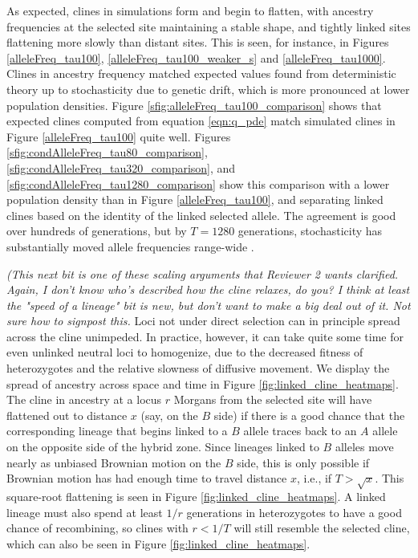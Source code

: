 \documentclass[11pt,letterpaper]{article}
\newcommand{\plr}[1]{{\em \color{blue} #1}}
\begin{document}
As expected, clines in simulations form and begin to flatten, 
with ancestry frequencies at the selected site maintaining a stable shape,
and tightly linked sites flattening more slowly than distant sites.
This is seen, for instance, in Figures \ref{alleleFreq_tau100},
\ref{alleleFreq_tau100_weaker_s} and \ref{alleleFreq_tau1000}. 
Clines in ancestry frequency matched expected values found from deterministic theory
up to stochasticity due to genetic drift, which is more pronounced at lower population densities.
Figure \ref{sfig:alleleFreq_tau100_comparison} shows that expected clines computed from equation \eqref{eqn:q_pde}
match simulated clines in Figure \ref{alleleFreq_tau100} quite well.
Figures \ref{sfig:condAlleleFreq_tau80_comparison}, \ref{sfig:condAlleleFreq_tau320_comparison}, and \ref{sfig:condAlleleFreq_tau1280_comparison}
show this comparison with a lower population density than in Figure \ref{alleleFreq_tau100},
and separating linked clines based on the identity of the linked selected allele.
The agreement is good over hundreds of generations, but by $T=1280$ generations,
stochasticity has substantially moved allele frequencies range-wide
\citep[which is unsurprising, as the total population size is only 5,000 diploids:][]{Polechova2011}.

\plr{(This next bit is one of these scaling arguments that Reviewer 2 wants clarified.  Again, I don't know who's described how the cline relaxes, do you?  I think at least the "speed of a lineage" bit is new, but don't want to make a big deal out of it.  Not sure how to signpost this.}
Loci not under direct selection can in principle spread across the cline unimpeded. 
In practice, however, it can take quite some time for even unlinked neutral loci to homogenize,
due to the decreased fitness of heterozygotes \citep{barton1986barrier}
and the relative slowness of diffusive movement.
We display the spread of ancestry across space and time in Figure \ref{fig:linked_cline_heatmaps}. 
The cline in ancestry at a locus $r$ Morgans from the selected site
will have flattened out to distance $x$ (say, on the $B$ side)
if there is a good chance that the corresponding lineage that begins linked to a $B$ allele
traces back to an $A$ allele on the opposite side of the hybrid zone.
Since lineages linked to $B$ alleles move nearly as unbiased Brownian motion on the $B$ side,
this is only possible if Brownian motion has had enough time to travel distance $x$,
i.e., if $T>\sqrt{x}$.
This square-root flattening is seen in Figure \ref{fig:linked_cline_heatmaps}.
A linked lineage must also spend at least $1/r$ generations in heterozygotes
to have a good chance of recombining,
so clines with $r<1/T$ will still resemble the selected cline,
which can also be seen in Figure \ref{fig:linked_cline_heatmaps}.
\end{document}
